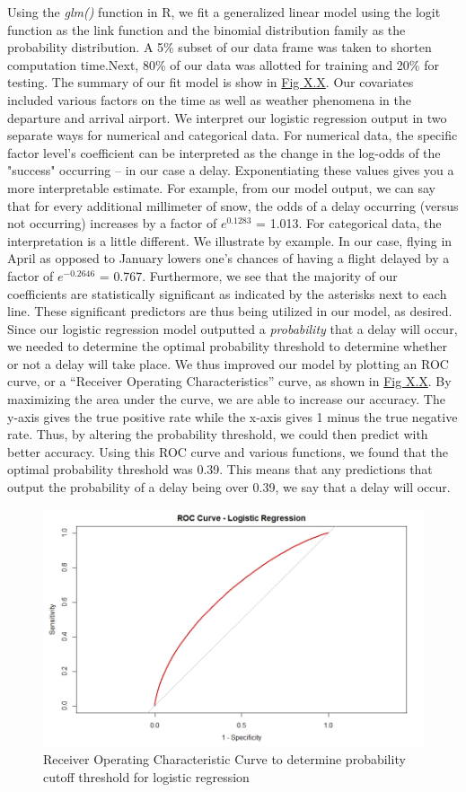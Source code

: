 \documentclass[12pt, a4paper, openany]{book}
\newcommand\tab[1][1cm]{\hspace*{#1}}
\begin{document}
	\tab Using the \textit{glm()} function in R, we fit a generalized linear model using the logit function as the link function and the binomial distribution family as the probability distribution. A 5\% subset of our data frame was taken to shorten computation time.Next, 80\% of our data was allotted for training and 20\% for testing. The summary of our fit model is show in \underline{Fig X.X}. Our covariates included various factors on the time as well as weather phenomena in the departure and arrival airport. We interpret our logistic regression output in two separate ways for numerical and categorical data. For numerical data, the specific factor level’s coefficient can be interpreted as the change in the log-odds of the "success" occurring – in our case a delay. Exponentiating these values gives you a more interpretable estimate. For example, from our model output, we can say that for every additional millimeter of snow, the odds of a delay occurring (versus not occurring) increases by a factor of $e^{0.1283}$ = 1.013. For categorical data, the interpretation is a little different. We illustrate by example. In our case, flying in April as opposed to January lowers one’s chances of having a flight delayed by a factor of $e^{-0.2646}$ = 0.767. Furthermore, we see that the majority of our coefficients are statistically significant as indicated by the asterisks next to each line. These significant predictors are thus being utilized in our model, as desired. \\
	\tab Since our logistic regression model outputted a \textit{probability} that a delay will occur, we needed to determine the optimal probability threshold to determine whether or not a delay will take place. We thus improved our model by plotting an ROC curve, or a “Receiver Operating Characteristics” curve, as shown in \underline{Fig X.X}. By maximizing the area under the curve, we are able to increase our accuracy. The y-axis gives the true positive rate while the x-axis gives 1 minus the true negative rate. Thus, by altering the probability threshold, we could then predict with better accuracy. Using this ROC curve and various functions, we found that the optimal probability threshold was 0.39. This means that any predictions that output the probability of a delay being over 0.39, we say that a delay will occur. \\
			\begin{figure}
			\centering
	 		\includegraphics[width = .55 \textwidth]{../figures/PLOTS FOR REPORT/Logistic Regression/ROC Curve - Logistic Regression}
	 		\caption{Receiver Operating Characteristic Curve to determine probability cutoff threshold for logistic regression}
	 		\end{figure}
\end{document}
